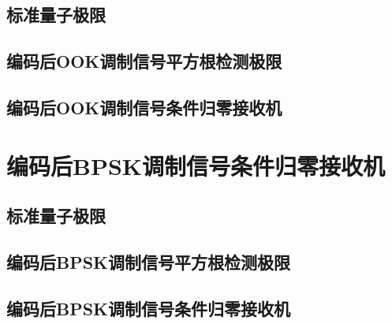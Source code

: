 \subsection{标准量子极限}

\subsection{编码后OOK调制信号平方根检测极限}

\subsection{编码后OOK调制信号条件归零接收机}



\section{编码后BPSK调制信号条件归零接收机}
\subsection{标准量子极限}

\subsection{编码后BPSK调制信号平方根检测极限}

\subsection{编码后BPSK调制信号条件归零接收机}


